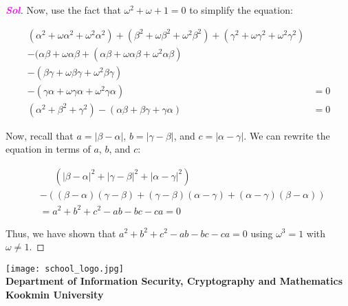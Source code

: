 \documentclass{article}
\newcommand{\footer}[1]{
\begin{flushright}
	\vspace{2em}
	\texttt{[image: school\_logo.jpg]} \\
	\vspace{1em}
	\textcolor{blue2}{\small\textbf{#1}}
\end{flushright}
}
\theoremstyle{definition}
\newcommand{\sol}{\textcolor{magenta}{\bf Sol}}
\begin{document}
\begin{enumerate}
\begin{proof}[\sol]
	Now, use the fact that $\omega^2 + \omega + 1 = 0$ to simplify the equation:

	\begin{align*}
	(\alpha^2 + \omega\alpha^2 + \omega^2\alpha^2) + (\beta^2 + \omega\beta^2 + \omega^2\beta^2) + (\gamma^2 + \omega\gamma^2 + \omega^2\gamma^2) \\
	- (\alpha\beta + \omega\alpha\beta +(\alpha\beta + \omega\alpha\beta + \omega^2\alpha\beta) \\
	- (\beta\gamma + \omega\beta\gamma + \omega^2\beta\gamma) \\
	- (\gamma\alpha + \omega\gamma\alpha + \omega^2\gamma\alpha) &= 0 \\
	(\alpha^2 + \beta^2 + \gamma^2) - (\alpha\beta + \beta\gamma + \gamma\alpha) &= 0
	\end{align*}

	Now, recall that $a = |\beta - \alpha|$, $b = |\gamma - \beta|$, and $c = |\alpha - \gamma|$. We can rewrite the equation in terms of $a$, $b$, and $c$:

	\begin{align*}
	&\phantom{{}={}}\, (|\beta - \alpha|^2 + |\gamma - \beta|^2 + |\alpha - \gamma|^2) \\
	&- ((\beta - \alpha)(\gamma - \beta) + (\gamma - \beta)(\alpha - \gamma) + (\alpha - \gamma)(\beta - \alpha)) \\
	&= a^2 + b^2 + c^2 - ab - bc - ca = 0
	\end{align*}

	Thus, we have shown that $a^2 + b^2 + c^2 - ab - bc - ca = 0$ using $\omega^3 = 1$ with $\omega \neq 1$.

	\end{proof}
\end{enumerate}


\footer{Department of Information Security, Cryptography and Mathematics\\ Kookmin University}
\end{document}
